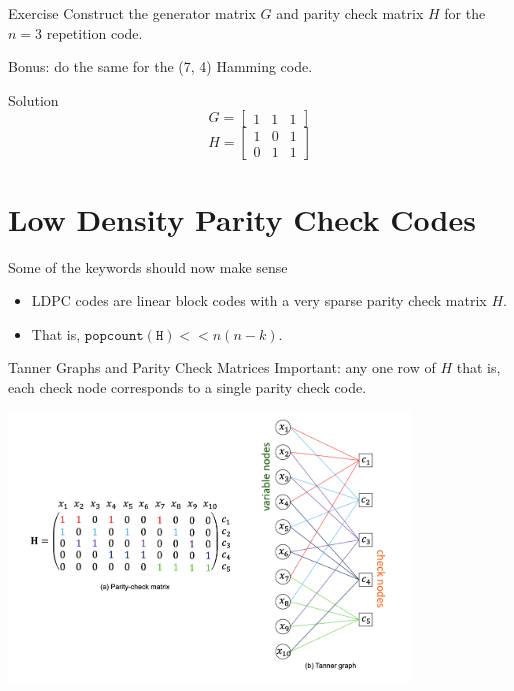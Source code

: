 \documentclass[aspectratio=1610, 10pt]{beamer}
\begin{document}
\begin{frame}[label={sec:org04653ba}]{Exercise}
Construct the generator matrix \(G\) and parity check matrix \(H\) for the
\(n=3\) repetition code.

Bonus: do the same for the (7, 4) Hamming code.
\end{frame}

\begin{frame}[label={sec:org28a358b}]{Solution}
$$G = \begin{bmatrix} 1&1&1\end{bmatrix}$$
$$H = \begin{bmatrix} 1&0&1\\0&1&1\end{bmatrix}$$
\end{frame}

\section{Low Density Parity Check Codes}
\label{sec:org8234c74}

\begin{frame}[label={sec:org62079db}]{Some of the keywords should now make sense}
\begin{itemize}
\item LDPC codes are linear block codes with a very sparse parity check
matrix \(H\).
\item That is, \(\mathtt{popcount(H)} << n(n-k)\).
\end{itemize}
\end{frame}

\begin{frame}[label={sec:org3efe749}]{Tanner Graphs and Parity Check Matrices}
\alert{Important:} any one row of \(H\) that is, each check node corresponds
to a \alert{single parity check code}.
\begin{center}
\includegraphics[width=0.8\textwidth]{./tanner.png}
\end{center}
\end{frame}
\end{document}
